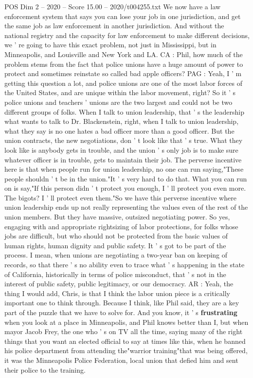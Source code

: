 \begin{textsample}{POS Dim 2 – 2020 – Score 15.00 – 2020/t004255.txt}
We now have a law enforcement system that says you can lose your job in one jurisdiction, and get the same job as law enforcement in another jurisdiction.
And without the national registry and the capacity for law enforcement to make different decisions, we ' re going to have this exact problem, not just in Mississippi, but in Minneapolis, and Louisville and New York and LA.
CA : Phil, how much of the problem stems from the fact that police unions have a huge amount of power to protect and sometimes reinstate so called bad apple officers?
PAG : Yeah, I ' m getting this question a lot, and police unions are one of the most labor forces of the United States, and are unique within the labor movement, right?
So it ' s police unions and teachers ' unions are the two largest and could not be two different groups of folks.
When I talk to union leadership, that ' s the leadership what wants to talk to Dr.
Blackenstein, right, when I talk to union leadership, what they say is no one hates a bad officer more than a good officer.
But the union contracts, the new negotiations, don ' t look like that ' s true.
What they look like is anybody gets in trouble, and the union ' s only job is to make sure whatever officer is in trouble, gets to maintain their job.
The perverse incentive here is that when people run for union leadership, no one can run saying,"These people shouldn ' t be in the union."It ' s very hard to do that.
What you can run on is say,"If this person didn ' t protect you enough, I ' ll protect you even more.
The bigots?
I ' ll protect even them."So we have this perverse incentive where union leadership ends up not really representing the values even of the rest of the union members.
But they have massive, outsized negotiating power.
So yes, engaging with and appropriate rightsizing of labor protections, for folks whose jobs are difficult, but who should not be protected from the basic values of human rights, human dignity and public safety.
It ' s got to be part of the process.
I mean, when unions are negotiating a two-year ban on keeping of records, so that there ' s no ability even to trace what ' s happening in the state of California, historically in terms of police misconduct, that ' s not in the interest of public safety, public legitimacy, or our democracy.
AR : Yeah, the thing I would add, Chris, is that I think the labor union piece is a critically important one to think through.
Because I think, like Phil said, they are a key part of the puzzle that we have to solve for.
And you know, it ' s \textbf{frustrating} when you look at a place in Minneapolis, and Phil knows better than I, but when mayor Jacob Frey, the one who ' s on TV all the time, saying many of the right things that you want an elected official to say at times like this, when he banned his police department from attending the"warrior training"that was being offered, it was the Minneapolis Police Federation, local union that defied him and sent their police to the training.

\end{textsample}
